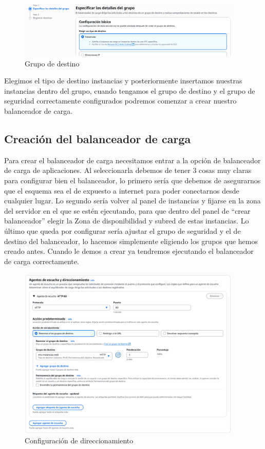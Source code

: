 \documentclass{article}
\begin{document}
	\begin{figure}[H]
	\centering
	\includegraphics[width=0.95\textwidth]{grupo_de_destino.png}
	\caption{Grupo de destino}
	\end{figure}

	Elegimos el tipo de destino instancias y posteriormente insertamos nuestras instancias dentro del grupo, cuando tengamos el grupo de destino y el grupo de seguridad correctamente configurados podremos comenzar a crear nuestro balanceador de carga.


\subsection{Creación del balanceador de carga}

Para crear el balanceador de carga necesitamos entrar a la opción de balanceador de carga de aplicaciones. Al seleccionarla debemos de tener 3 cosas muy claras para configurar bien el balanceador, lo primero sería que debemos de asegurarnos que el esquema sea el de expuesto a internet para poder conectarnos desde cualquier lugar. Lo segundo sería volver al panel de instancias y fijarse en la zona del servidor en el que se estén ejecutando, para que dentro del panel de ``crear balanceador'' elegir la Zona de disponibilidad y subred de estas instancias. Lo último que queda por configurar sería ajustar el grupo de seguridad y el de destino del balanceador, lo hacemos simplemente eligiendo los grupos que hemos creado antes. Cuando le demos a crear ya tendremos ejecutando el balanceador de carga correctamente.

	\begin{figure}[H]
	\centering
	\includegraphics[width=0.95\textwidth]{agentes_de_escucha.png}
	\caption{Configuración de direccionamiento}
	\end{figure}
\end{document}
